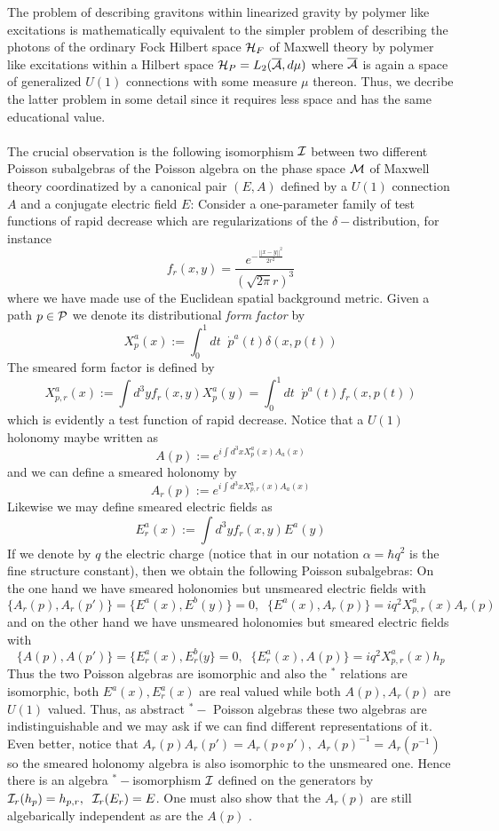 \documentclass[12pt]{report}
\def\be{\begin{equation}}
\def\ee{\end{equation}}
\def\a{{\cal A}}
\def\ab{\overline{\a}}
\begin{document}
The problem of describing gravitons within linearized gravity by 
polymer like excitations is mathematically equivalent to the simpler
problem of describing the photons of the ordinary Fock Hilbert space 
${\cal H}_F$ 
of Maxwell theory by polymer like excitations within a Hilbert space
${\cal H}_P=L_2(\ab,d\mu)$ where $\ab$ is again a space of generalized 
$U(1)$ connections with some measure $\mu$ thereon. Thus, we decribe 
the latter problem in some detail since it requires less space and has 
the same educational value.\\
\\
The crucial observation is the following isomorphism $\cal I$ between two 
different Poisson subalgebras of the Poisson algebra on the phase
space $\cal M$ of Maxwell theory coordinatized by a canonical pair 
$(E,A)$ defined by a $U(1)$ connection $A$ and a conjugate electric field 
$E$:
Consider a one-parameter family of
test functions of rapid decrease which are regularizations of
the $\delta-$distribution, for instance
\be \label{3.6.1}
f_r(x,y)=\frac{e^{-\frac{||x-y||^2}{2r^2}}}{(\sqrt{2\pi}r)^3}
\ee
where we have made use of the Euclidean spatial background
metric.
Given a path $p\in{\cal P}$ we denote its distributional {\it form factor}
by
\be \label{3.6.2}
X^a_p(x):=\int_0^1 dt \;\;\dot{p}^a(t) \delta(x,p(t))
\ee
The smeared form factor is defined by
\be \label{3.6.3}
X^a_{p,r}(x):=\int d^3y f_r(x,y) X^a_p(y)=\int_0^1 dt \;\;\dot{p}^a(t)
f_r(x,p(t))
\ee
which is evidently a test function of rapid decrease.
Notice that a $U(1)$ holonomy maybe written as
\be \label{3.6.4}
A(p):=e^{i\int d^3x X^a_p(x) A_a(x)}
\ee
and we can define a smeared holonomy by
\be \label{3.6.5}
A_r(p):=e^{i\int d^3x X^a_{p,r}(x) A_a(x)}
\ee
Likewise we may define smeared electric fields as
\be \label{3.6.6}
E^a_r(x):=\int d^3y f_r(x,y) E^a(y)
\ee
If we denote by $q$ the electric charge (notice that in
our notation $\alpha=\hbar q^2$ is the fine structure
constant), then we obtain the
following Poisson subalgebras:
On the one hand we have
smeared holonomies but unsmeared electric fields with
\be \label{3.6.7}
\{A_r(p),A_r(p')\}=\{E^a(x),E^b(y)\}=0,\;\;
\{E^a(x),A_r(p)\}=iq^2 X^a_{p,r}(x) A_r(p)
\ee
and on the other hand we have
unsmeared holonomies but smeared electric fields with
\be \label{3.6.8}
\{A(p),A(p')\}=\{E^a_r(x),E^b_r(y\}=0,\;\;
\{E^a_r(x),A(p)\}=iq^2 X^a_{p,r}(x) h_p
\ee
Thus the two Poisson algebras are isomorphic and also
the $^\ast$ relations are isomorphic, both
$E^a(x),E^a_r(x)$ are real valued while
both $A(p),A_r(p)$ are $U(1)$ valued. Thus, as abstract
$^\ast-$ Poisson algebras these two algebras are indistinguishable
and we may ask if we can find different representations
of it. Even better, notice that
$A_r(p) A_r(p')=A_r(p\circ p'),\;A_r(p)^{-1}=A_r(p^{-1})$
so the smeared holonomy algebra is also isomorphic to the
unsmeared one. Hence  there is an algebra 
$^\ast-$isomorphism ${\cal I}$ defined on the generators by
${\cal I}_r(h_p)=h_{p,r},\;\;{\cal I}_r(E_r)=E$. One must also 
show that the $A_r(p)$ are still algebarically independent as 
are the $A(p)$ \cite{69}.
\end{document}
